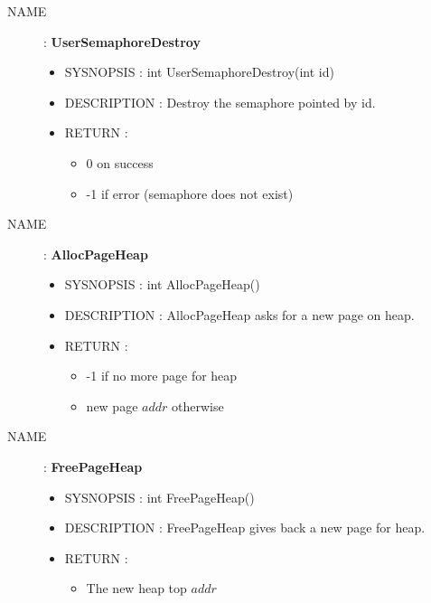 \documentclass[a4paper,10pt]{article}
\begin{document}
\begin{description}
    \item [NAME] : \textbf{UserSemaphoreDestroy}
        \begin{itemize}
            \item SYSNOPSIS : int UserSemaphoreDestroy(int id)
            \item DESCRIPTION :
                Destroy the semaphore pointed by id.
            \item RETURN :
                \begin{itemize}
                    \item 0 on success
                    \item -1 if error (semaphore does not exist)
                \end{itemize}
        \end{itemize}

    \item [NAME] : \textbf{AllocPageHeap}
        \begin{itemize}
            \item SYSNOPSIS : int AllocPageHeap()
            \item DESCRIPTION :
                AllocPageHeap asks for a new page on heap.
            \item RETURN :
                \begin{itemize}
                    \item -1 if no more page for heap
                    \item new page $addr$ otherwise
                \end{itemize}
        \end{itemize}

    \item [NAME] : \textbf{FreePageHeap}
        \begin{itemize}
            \item SYSNOPSIS : int FreePageHeap()
            \item DESCRIPTION :
                FreePageHeap gives back a new page for heap.
            \item RETURN :
                \begin{itemize}
                    \item The new heap top $addr$
                \end{itemize}
        \end{itemize}


\end{description}
\end{document}
